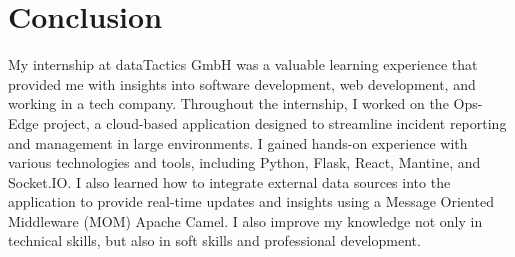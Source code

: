 \chapter{Conclusion}
\label{ch:conclusion}

My internship at dataTactics GmbH was a valuable learning experience that provided me with insights into software development, web development, and working in a tech company. Throughout the internship, I worked on the Ops-Edge project, a cloud-based application designed to streamline incident reporting and management in large environments. I gained hands-on experience with various technologies and tools, including Python, Flask, React, Mantine, and Socket.IO\@. I also learned how to integrate external data sources into the application to provide real-time updates and insights using a Message Oriented Middleware (MOM) Apache Camel. I also improve my knowledge not only in technical skills, but also in soft skills and professional development.